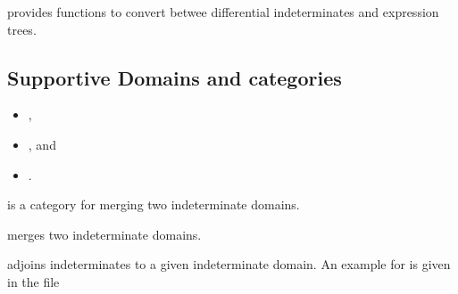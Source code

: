  provides functions to convert betwee differential indeterminates and expression trees.


\subsection{Supportive Domains and categories}

\begin{itemize}
\item {},
\item {}, and
\item {}.
\end{itemize}

 is a category for merging two indeterminate domains.

 merges two indeterminate domains.

 adjoins indeterminates to a given indeterminate domain. An example for  is given in the file 


\clearpage

